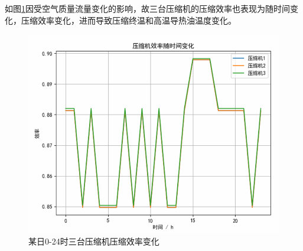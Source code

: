 \documentclass[journal,onecolumn]{IEEEtran}
\begin{document}
如图\ref{fig12a}因受空气质量流量变化的影响，故三台压缩机的压缩效率也表现为随时间变化，压缩效率变化，进而导致压缩终温和高温导热油温度变化。
\begin{figure}[h]
	\centering
	\includegraphics[width=0.7\linewidth]{pictures/screenshot024}
	\caption{某日0-24时三台压缩机压缩效率变化}
	\label{fig12a}
\end{figure}
\end{document}
